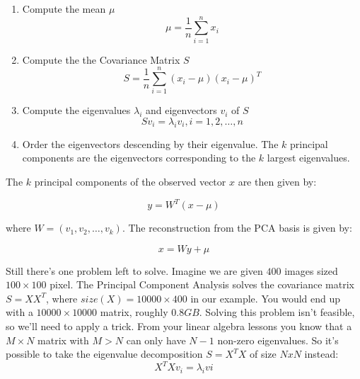 \begin{enumerate}
	\item Compute the mean $\mu$
		\begin{equation} \label{eqn:pca_mean}
			\mu = \frac{1}{n} \sum_{i=1}^{n} x_{i}
		\end{equation}
	\item Compute the the Covariance Matrix $S$
		\begin{equation} \label{eqn:pca_cov}
			S = \frac{1}{n} \sum_{i=1}^{n} (x_{i} - \mu) (x_{i} - \mu)^{T}
		\end{equation}
	\item Compute the eigenvalues $\lambda_{i}$ and eigenvectors $v_{i}$ of $S$
		\begin{equation}  \label{eqn:pca_eigenvalues}
			S v_{i} = \lambda_{i} v_{i}, i=1,2,\ldots,n
		\end{equation}
	\item Order the eigenvectors descending by their eigenvalue. The $k$ principal components are the eigenvectors corresponding to the $k$ largest eigenvalues.
\end{enumerate}

The $k$ principal components of the observed vector $x$ are then given by:

\begin{equation} \label{eqn:pca_projection}
	y = W^{T} (x - \mu)
\end{equation}

where $W = (v_{1}, v_{2}, \ldots, v_{k})$. The reconstruction from the PCA basis is given by:

\begin{equation} \label{eqn:pca_reconstruction}
	x = W y + \mu
\end{equation}

Still there's one problem left to solve. Imagine we are given $400$ images sized $100 \times 100$ pixel. The Principal Component Analysis solves the covariance matrix $S = X X^{T}$, where ${size}(X) = 10000 \times 400$ in our example. You would end up with a $10000 \times 10000$ matrix, roughly $0.8 GB$. Solving this problem isn't feasible, so we'll need to apply a trick. From your linear algebra lessons you know that a $M \times N$ matrix with $M > N$ can only have $N - 1$ non-zero eigenvalues. So it's possible to take the eigenvalue decomposition $S = X^{T} X$ of size $N x N$ instead:
\begin{equation}
	X^{T} X v_{i} = \lambda_{i} v{i}
\end{equation}

